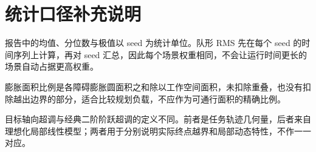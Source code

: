 \documentclass[UTF8,a4paper,12pt,fontset=windows]{ctexart}
\begin{document}
\section{统计口径补充说明}

报告中的均值、分位数与极值以 seed 为统计单位。队形 RMS 先在每个 seed 的时间序列上计算，再对 seed 汇总，因此每个场景权重相同，不会让运行时间更长的场景自动占据更高权重。

膨胀面积比例是各障碍膨胀圆面积之和除以工作空间面积，未扣除重叠，也没有扣除越出边界的部分，适合比较规划负载，不应作为可通行面积的精确比例。

目标轴向超调与经典二阶阶跃超调的定义不同。前者是任务轨迹几何量，后者来自理想化局部线性模型；两者用于分别说明实际终点越界和局部动态特性，不作一一对应。

\endgroup
\end{document}
